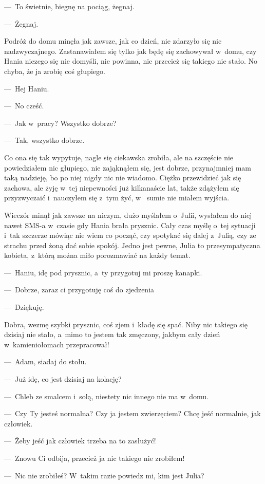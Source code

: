 ---~To świetnie, biegnę na pociąg, żegnaj.

---~Żegnaj.

Podróż do domu minęła jak zawsze, jak co dzień, nie zdarzyło się nic nadzwyczajnego. Zastanawiałem się tylko jak będę 
się zachowywał w~domu, czy Hania niczego się nie domyśli, nie powinna, nic przecież się takiego nie stało. No chyba, 
że ja zrobię coś głupiego.

---~Hej Haniu.

---~No cześć.

---~Jak w~pracy? Wszystko dobrze?

---~Tak, wszystko dobrze.

Co ona się tak wypytuje, nagle się ciekawska zrobiła, ale na szczęście nie powiedziałem nic głupiego, nie zająknąłem 
się, jest dobrze, przynajmniej mam taką nadzieję, bo po niej nigdy nic nie wiadomo. Ciężko przewidzieć jak się 
zachowa, ale żyję w~tej niepewności już kilkanaście lat, także zdążyłem się przyzwyczaić i~nauczyłem się z~tym żyć, w~
sumie nie miałem wyjścia.

Wieczór minął jak zawsze na niczym, dużo myślałem o~Julii, wysłałem do niej nawet SMS-a w~czasie gdy Hania brała 
prysznic. Cały czas myślę o~tej sytuacji i~tak szczerze mówiąc nie wiem co począć, czy spotykać się dalej z~Julią, 
czy ze strachu przed żoną dać sobie spokój. Jedno jest pewne, Julia to przesympatyczna kobieta, z~którą można miło 
porozmawiać na każdy temat.

---~Haniu, idę pod prysznic, a~ty przygotuj mi proszę kanapki.

---~Dobrze, zaraz ci przygotuję coś do zjedzenia

---~Dziękuję.

Dobra, wezmę szybki prysznic, coś zjem i~kładę się spać. Niby nic takiego się dzisiaj nie stało, a~mimo to jestem tak 
zmęczony, jakbym cały dzień w~kamieniołomach przepracował!

---~Adam, siadaj do stołu.

---~Już idę, co jest dzisiaj na kolację?

---~Chleb ze smalcem i~solą, niestety nic innego nie ma w~domu.

---~Czy Ty jesteś normalna? Czy ja jestem zwierzęciem? Chcę jeść normalnie, jak człowiek.

---~Żeby jeść jak człowiek trzeba na to zasłużyć!

---~Znowu Ci odbija, przecież ja nic takiego nie zrobiłem!

---~Nic nie zrobiłeś? W~takim razie powiedz mi, kim jest Julia?


